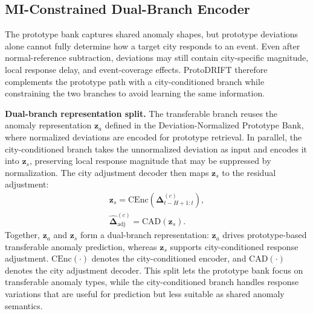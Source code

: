 \subsection{MI-Constrained Dual-Branch Encoder}

The prototype bank captures shared anomaly shapes, but prototype deviations alone cannot fully determine how a target city responds to an event. Even after normal-reference subtraction, deviations may still contain city-specific magnitude, local response delay, and event-coverage effects. ProtoDRIFT therefore complements the prototype path with a city-conditioned branch while constraining the two branches to avoid learning the same information.

\textbf{Dual-branch representation split.} The transferable branch reuses the anomaly representation $\mathbf{z}_a$ defined in the Deviation-Normalized Prototype Bank, where normalized deviations are encoded for prototype retrieval. In parallel, the city-conditioned branch takes the unnormalized deviation as input and encodes it into $\mathbf{z}_s$, preserving local response magnitude that may be suppressed by normalization. The city adjustment decoder then maps $\mathbf{z}_s$ to the residual adjustment:
\begin{equation}
\begin{gathered}
    \mathbf{z}_s=\mathrm{CEnc}\left(\boldsymbol{\Delta}^{(c)}_{t-H+1:t}\right), \\
    \widehat{\boldsymbol{\Delta}}^{(c)}_{\mathrm{adj}}=\mathrm{CAD}(\mathbf{z}_s).
\end{gathered}
\end{equation}
Together, $\mathbf{z}_a$ and $\mathbf{z}_s$ form a dual-branch representation: $\mathbf{z}_a$ drives prototype-based transferable anomaly prediction, whereas $\mathbf{z}_s$ supports city-conditioned response adjustment. $\mathrm{CEnc}(\cdot)$ denotes the city-conditioned encoder, and $\mathrm{CAD}(\cdot)$ denotes the city adjustment decoder. This split lets the prototype bank focus on transferable anomaly types, while the city-conditioned branch handles response variations that are useful for prediction but less suitable as shared anomaly semantics.

